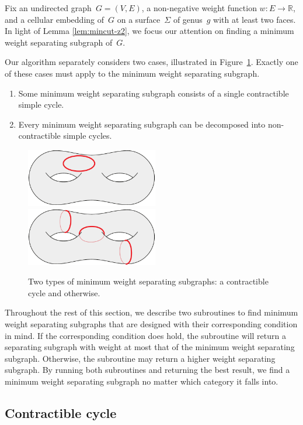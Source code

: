 \documentclass[11pt,twoside]{article}
\def\Real{\mathbb{R}}
\begin{document}
{Fix an undirected graph~$G=(V,E)$, a non-negative weight function ${w\colon E\to \Real}$, and a cellular embedding of~$G$ on a surface~$\Sigma$ of genus~$g$ with at least two faces.  In light of Lemma \ref{lem:mincut-z2}, we focus our attention on finding a minimum weight separating subgraph of~$G$. 

Our algorithm separately considers two cases, illustrated in Figure~\ref{fig:global_cases}. Exactly one of these cases must apply to the minimum weight separating subgraph.
\begin{enumerate}
  \item
    Some minimum weight separating subgraph consists of a single contractible simple cycle.
  \item
    Every minimum weight separating subgraph can be decomposed into non-contractible simple cycles.
\end{enumerate}
%
\begin{figure}[ht]
\centering
\includegraphics[height=1in]{Fig/shortcon2}\qquad
\includegraphics[height=1in]{Fig/homologous1}
\caption{Two types of minimum weight separating subgraphs: a contractible cycle and otherwise.}
\label{fig:global_cases}
\end{figure}
%

Throughout the rest of this section, we describe two subroutines to find minimum weight separating subgraphs that are designed with their corresponding condition in mind. If the corresponding condition does hold, the subroutine will return a separating subgraph with weight at most that of the minimum weight separating subgraph. Otherwise, the subroutine may return a higher weight separating subgraph. By running both subroutines and returning the best result, we find a minimum weight separating subgraph no matter which category it falls into.


\subsection{Contractible cycle}
\label{sec:global_contractible}

}
\end{document}
